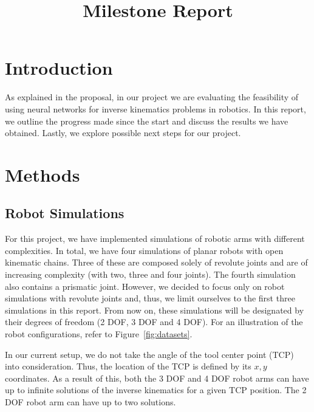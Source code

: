\documentclass[conference]{IEEEtran}
\begin{document}
\title{Milestone Report}

\author{
    \and
}

\maketitle

\section*{Introduction}
As explained in the proposal, in our project we are evaluating the feasibility of using neural networks for inverse kinematics problems in robotics. In this report, we outline the progress made since the start and discuss the results we have obtained. Lastly, we explore possible next steps for our project.

\section*{Methods}
\subsection*{Robot Simulations}
For this project, we have implemented simulations of robotic arms with different complexities. In total, we have four simulations of planar robots with open kinematic chains. Three of these are composed solely of revolute joints and are of increasing complexity (with two, three and four joints). The fourth simulation also contains a prismatic joint. However, we decided to focus only on robot simulations with revolute joints and, thus, we limit ourselves to the first three simulations in this report. From now on, these simulations will be designated by their degrees of freedom (2 DOF, 3 DOF and 4 DOF). For an illustration of the robot configurations, refer to Figure~\ref{fig:datasets}.

In our current setup, we do not take the angle of the tool center point (TCP) into consideration. Thus, the location of the TCP is defined by its $ x, y $ coordinates. As a result of this, both the 3 DOF and 4 DOF robot arms can have up to infinite solutions of the inverse kinematics for a given TCP position. The 2 DOF robot arm can have up to two solutions.
\end{document}
